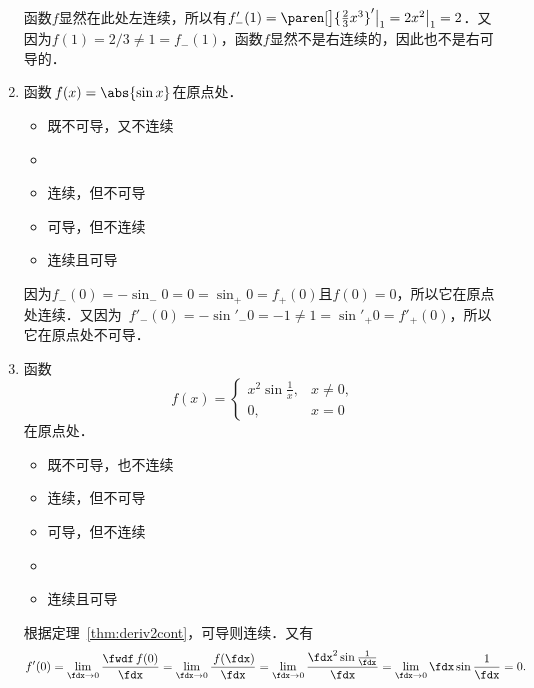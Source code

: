 \begin{enumerate}
  \ifshowsol
  函数\(f\)显然在此处左连续，所以有\(f'_-(1) = \paren[\big]{\frac23 x^3}'\big\vert_1 = 2x^2\big\vert_1 = 2\)．又因为\(f(1) = 2/3 \ne 1 = f_-(1)\)，函数\(f\)显然不是右连续的，因此也不是右可导的．
  \fi

\item 函数\(\,f(x) = \abs{\sin x}\)在原点处\uline{\hspace{8em}}．
  \begin{itemize}
    \renewcommand{\labelitemi}{\faCircleThin}
  \item 既不可导，又不连续
    \ifshowsol
  \item[\faCircle]
    \else
  \item
    \fi
    连续，但不可导
  \item 可导，但不连续
  \item 连续且可导
  \end{itemize}

  \ifshowsol
  因为\(f_-(0) = -\sin_-0 = 0 = \sin_+0 = f_+(0)\)且\(f(0) = 0\)，所以它在原点处连续．又因为~\(f'_-(0) = -\sin'_-0 = -1 \ne 1 = \sin'_+0 = f'_+(0)\)，所以它在原点处不可导．
  \fi

\item \label{B1.4.1.E4}函数
  \begin{equation*}
    f(x) =
    \begin{cases}
      x^2 \sin\frac1x, & x \ne 0, \\
      0, & x = 0
    \end{cases}
  \end{equation*}
  在原点处\uline{\hspace{8em}}．
  \begin{itemize}
    \renewcommand{\labelitemi}{\faCircleThin}
  \item 既不可导，也不连续
  \item 连续，但不可导
  \item 可导，但不连续
    \ifshowsol
  \item[\faCircle]
    \else
  \item
    \fi
    连续且可导
  \end{itemize}

  \ifshowsol
  根据定理~\ref{thm:deriv2cont}，可导则连续．又有
  \begin{equation*}
    f'(0)
    = \lim_{\fdx\to0} \frac{\fwdf\,f(0)}{\fdx}
    = \lim_{\fdx\to0} \frac{\,f(\fdx)}{\fdx}
    = \lim_{\fdx\to0} \frac{\fdx^2 \sin\frac1\fdx}{\fdx}
    = \lim_{\fdx\to0} \fdx \sin\frac1\fdx
    = 0.
  \end{equation*}
  \fi


\end{enumerate}
